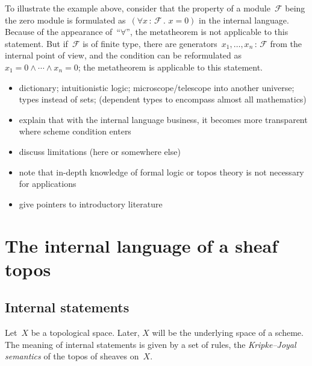\documentclass[10pt]{amsart}
\theoremstyle{definition}
\theoremstyle{plain}
\theoremstyle{remark}
\newcommand{\F}{\mathcal{F}}
\newcommand{\Sh}{\mathrm{Sh}}
\newcommand{\?}{\,{:}\,}
\renewcommand{\_}{\mathpunct{.}\,}
\newcommand{\notat}[1]{{!#1}}
\begin{document}
To illustrate the example above, consider that the property of a module~$\F$ being
the zero module is formulated as~$(\forall x\?\F\_ x = 0)$ in the internal
language. Because of the appearance of~``$\forall$'', the metatheorem is not
applicable to this statement. But if~$\F$ is of finite type, there are
generators~$x_1,\ldots,x_n\?\F$ from the internal point of view, and the
condition can be reformulated as~$x_1 = 0 \wedge \cdots \wedge x_n = 0$; the
metatheorem is applicable to this statement.


\begin{itemize}
\item dictionary; intuitionistic logic; microscope/telescope into another
universe; types instead of sets; (dependent types to encompass almost all
mathematics)
\item explain that with the internal language business, it becomes more
transparent where scheme condition enters
\item discuss limitations (here or somewhere else)
\item note that in-depth knowledge of formal logic or topos theory is not necessary for
applications
\item give pointers to introductory literature
\end{itemize}


\section{The internal language of a sheaf topos}

\subsection{Internal statements}
Let~$X$ be a topological space. Later, $X$ will be the underlying space of a
scheme. The meaning of internal statements is given by a set of rules, the
\emph{Kripke--Joyal semantics} of the topos of sheaves on~$X$.
\end{document}
